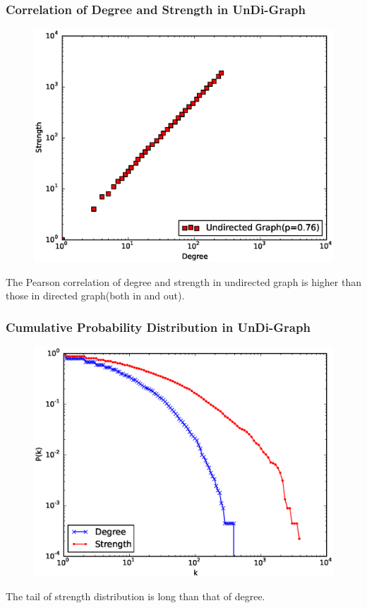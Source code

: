 \documentclass{beamer}
\begin{document}
\begin{frame}
\frametitle{Correlation of Degree and Strength in UnDi-Graph}
\begin{figure}
\includegraphics[width=.65\linewidth]{undirect.eps}
\end{figure}
\small{The Pearson correlation of degree and strength in undirected graph is higher than those in directed graph(both in and out).}
\end{frame}


\begin{frame}
\frametitle{Cumulative Probability Distribution in UnDi-Graph}
\begin{figure}
\includegraphics[width=.65\linewidth]{un_degree.eps}
\end{figure}
\small{The tail of strength distribution is long than that of degree.}
\end{frame}
\end{document}

